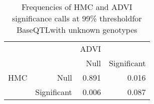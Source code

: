 \begin{table}[ht]
\centering
\caption{Frequencies of HMC and ADVI significance calls at 99\% thresholdfor BaseQTLwith unknown genotypes} 
\label{tab:noGT-xtab-prop-99}
\begin{tabular}{rr|rr}
   &  & ADVI &  \\ 
    &   & Null & Significant \\ 
   \hline
HMC & Null & 0.891 & 0.016 \\ 
    & Significant & 0.006 & 0.087 \\ 
  \end{tabular}
\end{table}
